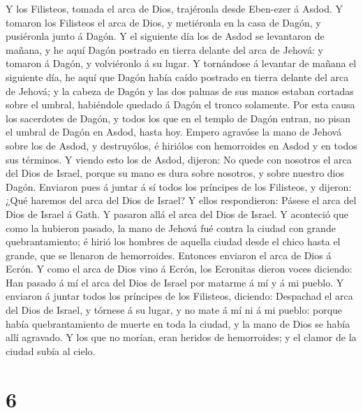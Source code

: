  Y los Filisteos, tomada el arca de Dios, trajéronla desde
Eben-ezer á Asdod.  Y tomaron los Filisteos el arca de Dios,
y metiéronla en la casa de Dagón, y pusiéronla junto á Dagón.
 Y el siguiente día los de Asdod se levantaron de mañana, y
he aquí Dagón postrado en tierra delante del arca de Jehová: y tomaron á
Dagón, y volviéronlo á su lugar.  Y tornándose á levantar de
mañana el siguiente día, he aquí que Dagón había caído postrado en
tierra delante del arca de Jehová; y la cabeza de Dagón y las dos palmas
de sus manos estaban cortadas sobre el umbral, habiéndole quedado á
Dagón el tronco solamente.  Por esta causa los sacerdotes de
Dagón, y todos los que en el templo de Dagón entran, no pisan el umbral
de Dagón en Asdod, hasta hoy.  Empero agravóse la mano de
Jehová sobre los de Asdod, y destruyólos, é hiriólos con hemorroides en
Asdod y en todos sus términos.  Y viendo esto los de Asdod,
dijeron: No quede con nosotros el arca del Dios de Israel, porque su
mano es dura sobre nosotros, y sobre nuestro dios Dagón. 
Enviaron pues á juntar á sí todos los príncipes de los Filisteos, y
dijeron: ¿Qué haremos del arca del Dios de Israel? Y ellos respondieron:
Pásese el arca del Dios de Israel á Gath. Y pasaron allá el arca del
Dios de Israel.  Y aconteció que como la hubieron pasado, la
mano de Jehová fué contra la ciudad con grande quebrantamiento; é hirió
los hombres de aquella ciudad desde el chico hasta el grande, que se
llenaron de hemorroides.  Entonces enviaron el arca de Dios
á Ecrón. Y como el arca de Dios vino á Ecrón, los Ecronitas dieron voces
diciendo: Han pasado á mí el arca del Dios de Israel por matarme á mí y
á mi pueblo.  Y enviaron á juntar todos los príncipes de
los Filisteos, diciendo: Despachad el arca del Dios de Israel, y tórnese
á su lugar, y no mate á mí ni á mi pueblo: porque había quebrantamiento
de muerte en toda la ciudad, y la mano de Dios se había allí agravado.
 Y los que no morían, eran heridos de hemorroides; y el
clamor de la ciudad subía al cielo.

\hypertarget{section-5}{%
\section{6}\label{section-5}}


